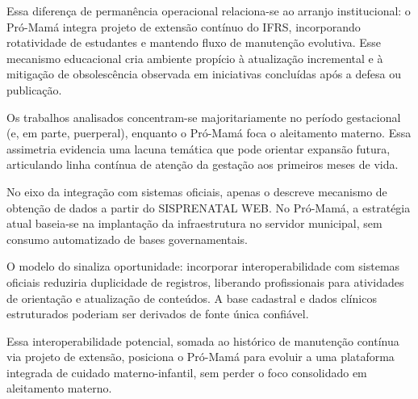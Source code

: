 Essa diferença de permanência operacional relaciona-se ao arranjo institucional: o Pró-Mamá integra projeto de extensão contínuo do IFRS, incorporando rotatividade de estudantes e mantendo fluxo de manutenção evolutiva. Esse mecanismo educacional cria ambiente propício à atualização incremental e à mitigação de obsolescência observada em iniciativas concluídas após a defesa ou publicação.

Os trabalhos analisados concentram-se majoritariamente no período gestacional (e, em parte, puerperal), enquanto o Pró-Mamá foca o aleitamento materno. Essa assimetria evidencia uma lacuna temática que pode orientar expansão futura, articulando linha contínua de atenção da gestação aos primeiros meses de vida.

No eixo da integração com sistemas oficiais, apenas o  descreve mecanismo de obtenção de dados a partir do SISPRENATAL WEB. No Pró-Mamá, a estratégia atual baseia-se na implantação da infraestrutura no servidor municipal, sem consumo automatizado de bases governamentais.

O modelo do  sinaliza oportunidade: incorporar interoperabilidade com sistemas oficiais reduziria duplicidade de registros, liberando profissionais para atividades de orientação e atualização de conteúdos. A base cadastral e dados clínicos estruturados poderiam ser derivados de fonte única confiável.

Essa interoperabilidade potencial, somada ao histórico de manutenção contínua via projeto de extensão, posiciona o Pró-Mamá para evoluir a uma plataforma integrada de cuidado materno-infantil, sem perder o foco consolidado em aleitamento materno.
